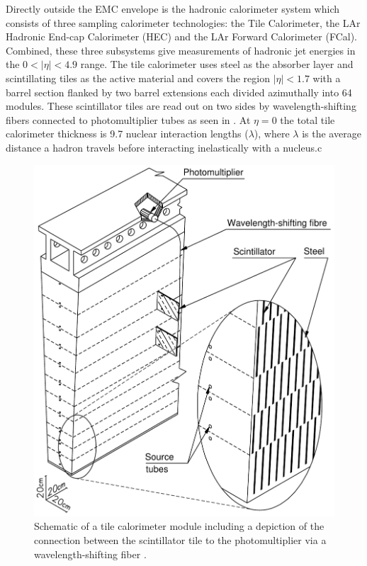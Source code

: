 Directly outside the EMC envelope is the hadronic calorimeter system
\cite{PERF-2007-01} which consists of three sampling calorimeter technologies:
the Tile Calorimeter, the LAr Hadronic End-cap Calorimeter (HEC) and the LAr
Forward Calorimeter (FCal).  Combined, these three subsystems give measurements
of hadronic jet energies in the $0 <|\eta| < 4.9$ range. The tile calorimeter
uses steel as the absorber layer and scintillating tiles as the active material
and covers the region $|\eta| < 1.7$ with a barrel section flanked by two barrel
extensions each divided azimuthally into 64 modules.  These scintillator tiles
are read out on two sides by wavelength-shifting fibers connected to
photomultiplier tubes as seen in . At $\eta =
0$ the total tile calorimeter thickness is 9.7 nuclear interaction lengths
($\lambda$), where $\lambda$ is the average distance a hadron travels before
interacting inelastically with a nucleus.c
\begin{figure}[!htbp]
  \begin{center}
    \includegraphics[width=0.8\linewidth]{figures/atlas/tile_calorimeter.pdf}
    \caption{Schematic of a tile calorimeter module
including a depiction of the connection between the scintillator tile to the
photomultiplier via a wavelength-shifting fiber \cite{PERF-2007-01}.}
    \label{fig:tile_calorimeter}
  \end{center}
\end{figure}

